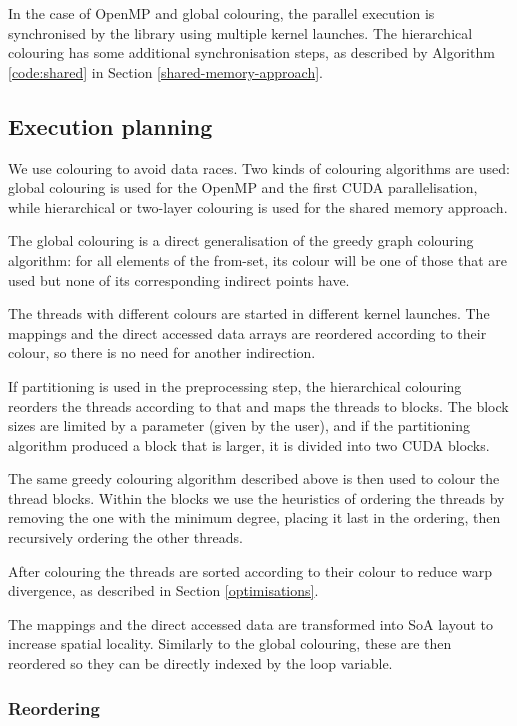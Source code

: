 In the case of OpenMP and global colouring, the parallel execution is
synchronised by the library using multiple kernel launches. The hierarchical
colouring has some additional synchronisation steps, as described by Algorithm
\ref{code:shared} in Section \ref{shared-memory-approach}.

\subsection{Execution planning}

We use colouring to avoid data races. Two kinds of colouring algorithms are
used: global colouring is used for the OpenMP and the first CUDA
parallelisation, while hierarchical or two-layer colouring is used for the
shared memory approach.

The global colouring is a direct generalisation of the greedy graph colouring
algorithm: for all elements of the from-set, its colour will be one of those
that are used but none of its corresponding indirect points have.

The threads with different colours are started in different kernel launches. The
mappings and the direct accessed data arrays are reordered according to their
colour, so there is no need for another indirection.

If partitioning is used in the preprocessing step, the hierarchical colouring
reorders the threads according to that and maps the threads to blocks. The block
sizes are limited by a parameter (given by the user), and if the partitioning
algorithm produced a block that is larger, it is divided into two CUDA blocks.

The same greedy colouring algorithm described above is then used to colour the
thread blocks. Within the blocks we use the heuristics of ordering the threads
by removing the one with the minimum degree, placing it last in the ordering,
then recursively ordering the other threads.

After colouring the threads are sorted according to their colour to reduce warp
divergence, as described in Section \ref{optimisations}.

The mappings and the direct accessed data are transformed into SoA layout to
increase spatial locality. Similarly to the global colouring, these are then
reordered so they can be directly indexed by the loop variable.

\subsubsection{Reordering}

